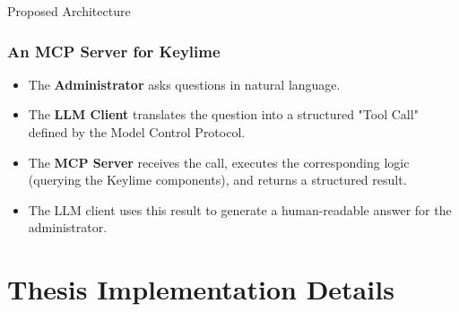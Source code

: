 \documentclass{beamer}
\begin{document}
\begin{frame}{Proposed Architecture}
    \frametitle{An MCP Server for Keylime}

    \begin{itemize}
        \item The \textbf{Administrator} asks questions in natural language.
        \item The \textbf{LLM Client} translates the question into a structured "Tool Call" defined by the Model Control Protocol.
        \item The \textbf{MCP Server} receives the call, executes the corresponding logic (querying the Keylime components), and returns a structured result.
        \item The LLM client uses this result to generate a human-readable answer for the administrator.
    \end{itemize}
\end{frame}

\section{Thesis Implementation Details}
\end{document}
